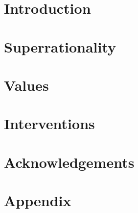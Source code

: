 \documentclass{book}
\begin{document}
\maketitle    %



\newpage

\tableofcontents

\chapter{Introduction}
\label{ch:intro}


\chapter{Superrationality} %
\label{ch:superrationality}


\chapter{Values}
\label{ch:values}


\chapter{Interventions}
\label{ch:interventions}


\chapter{Acknowledgements}
\label{ch:acknowledgements}


\chapter{Appendix}
\label{ch:appendix}



\begin{sloppypar} %
\printbibliography
\end{sloppypar}
\end{document}
